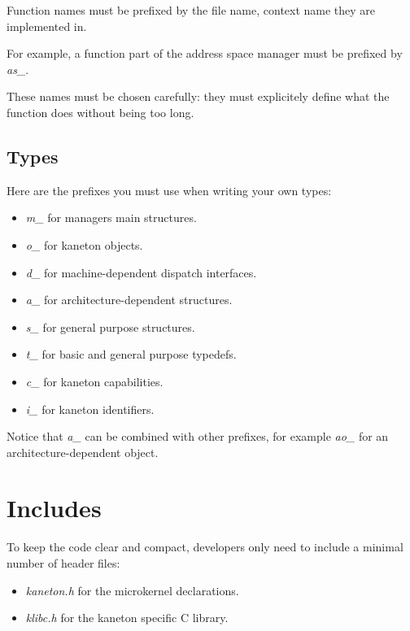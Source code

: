 Function names must be prefixed by the file name, context name they are
implemented in.

For example, a function part of the address space manager must be prefixed
by \textit{as\_}.

These names must be chosen carefully: they must explicitely define
what the function does without being too long.

%
%

\subsection{Types}

Here are the prefixes you must use when writing your own types:

\begin{itemize}
  \item
    \textit{m\_} for managers main structures.
  \item
    \textit{o\_} for kaneton objects.
  \item
    \textit{d\_} for machine-dependent dispatch interfaces.
  \item
    \textit{a\_} for architecture-dependent structures.
  \item
    \textit{s\_} for general purpose structures.
  \item
    \textit{t\_} for basic and general purpose typedefs.
  \item
    \textit{c\_} for kaneton capabilities.
  \item
    \textit{i\_} for kaneton identifiers.
\end{itemize}

Notice that \textit{a\_} can be combined with other prefixes, for
example \textit{ao\_} for an architecture-dependent object.

%
%

\section{Includes}

To keep the code clear and compact, developers only need to include a
minimal number of header files:

\begin{itemize}
  \item
    \textit{kaneton.h} for the microkernel declarations.
  \item
    \textit{klibc.h} for the kaneton specific C library.
\end{itemize}

